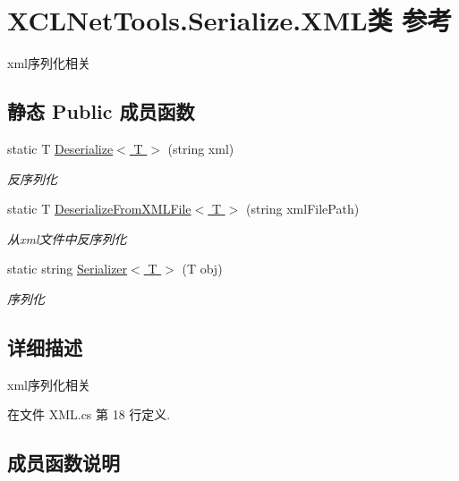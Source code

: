 \hypertarget{class_x_c_l_net_tools_1_1_serialize_1_1_x_m_l}{}\section{X\+C\+L\+Net\+Tools.\+Serialize.\+X\+M\+L类 参考}
\label{class_x_c_l_net_tools_1_1_serialize_1_1_x_m_l}


xml序列化相关  


\subsection*{静态 Public 成员函数}
\begin{DoxyCompactItemize}
\item 
static T \hyperlink{class_x_c_l_net_tools_1_1_serialize_1_1_x_m_l_a10f494104b432660b2cbfbd686425ff9}{Deserialize$<$ T $>$} (string xml)
\begin{DoxyCompactList}\small\item\em 反序列化 \end{DoxyCompactList}\item 
static T \hyperlink{class_x_c_l_net_tools_1_1_serialize_1_1_x_m_l_afdebd810bc96d095cab8ccdf8aaca684}{Deserialize\+From\+X\+M\+L\+File$<$ T $>$} (string xml\+File\+Path)
\begin{DoxyCompactList}\small\item\em 从xml文件中反序列化 \end{DoxyCompactList}\item 
static string \hyperlink{class_x_c_l_net_tools_1_1_serialize_1_1_x_m_l_a9540436b849eff236f8353cad8b20658}{Serializer$<$ T $>$} (T obj)
\begin{DoxyCompactList}\small\item\em 序列化 \end{DoxyCompactList}\end{DoxyCompactItemize}


\subsection{详细描述}
xml序列化相关 



在文件 X\+M\+L.\+cs 第 18 行定义.



\subsection{成员函数说明}
